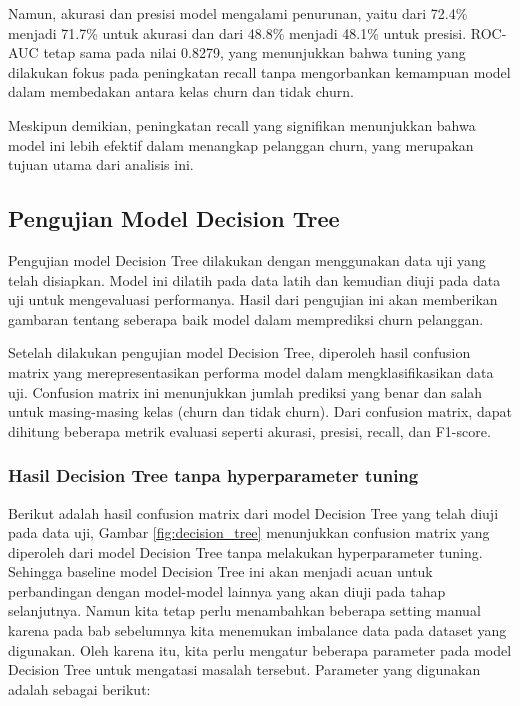 Namun, akurasi dan presisi model mengalami penurunan, yaitu dari 72.4\% menjadi 71.7\% untuk akurasi dan dari 48.8\% menjadi 48.1\% untuk presisi. ROC-AUC tetap sama pada nilai 0.8279, yang menunjukkan bahwa tuning yang dilakukan fokus pada peningkatan recall tanpa mengorbankan kemampuan model dalam membedakan antara kelas churn dan tidak churn.

Meskipun demikian, peningkatan recall yang signifikan menunjukkan bahwa model ini lebih efektif dalam menangkap pelanggan churn, yang merupakan tujuan utama dari analisis ini.

\newpage
\subsection{Pengujian Model Decision Tree}
Pengujian model Decision Tree dilakukan dengan menggunakan data uji yang telah disiapkan. Model ini dilatih pada data latih dan kemudian diuji pada data uji untuk mengevaluasi performanya. Hasil dari pengujian ini akan memberikan gambaran tentang seberapa baik model dalam memprediksi churn pelanggan.

Setelah dilakukan pengujian model Decision Tree, diperoleh hasil confusion matrix yang merepresentasikan performa model dalam mengklasifikasikan data uji. Confusion matrix ini menunjukkan jumlah prediksi yang benar dan salah untuk masing-masing kelas (churn dan tidak churn). Dari confusion matrix, dapat dihitung beberapa metrik evaluasi seperti akurasi, presisi, recall, dan F1-score.

\subsubsection{Hasil Decision Tree tanpa hyperparameter tuning}
Berikut adalah hasil confusion matrix dari model Decision Tree yang telah diuji pada data uji, Gambar \ref{fig:decision_tree} menunjukkan confusion matrix yang diperoleh dari model Decision Tree tanpa melakukan hyperparameter tuning. Sehingga baseline model Decision Tree ini akan menjadi acuan untuk perbandingan dengan model-model lainnya yang akan diuji pada tahap selanjutnya. Namun kita tetap perlu menambahkan beberapa setting manual karena pada bab sebelumnya kita menemukan imbalance data pada dataset yang digunakan. Oleh karena itu, kita perlu mengatur beberapa parameter pada model Decision Tree untuk mengatasi masalah tersebut.  Parameter yang digunakan adalah sebagai berikut:

